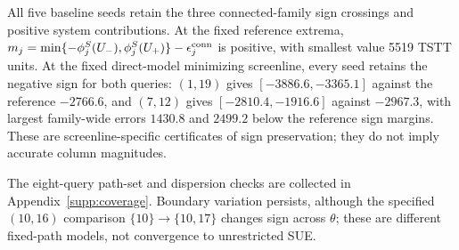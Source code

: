 All five baseline seeds retain the three connected-family sign
crossings and positive system contributions. At the fixed reference
extrema,
$m_j=\min\{-\phi_j^S(U_-),\phi_j^S(U_+)\}-\epsilon_j^{\rm conn}$
is positive, with smallest value 5519 TSTT units. At the fixed
direct-model minimizing screenline, every seed retains the negative
sign for both queries: $(1,19)$ gives $[-3886.6,-3365.1]$ against the
reference $-2766.6$, and $(7,12)$ gives $[-2810.4,-1916.6]$ against
$-2967.3$, with largest family-wide errors $1430.8$ and $2499.2$ below
the reference sign margins. These are screenline-specific certificates
of sign preservation; they do not imply accurate column magnitudes.


The eight-query path-set and dispersion checks are collected in
Appendix~\ref{supp:coverage}. Boundary variation persists, although
the specified $(10,16)$ comparison $\{10\}\to\{10,17\}$ changes sign
across $\theta$; these are different fixed-path models, not convergence
to unrestricted SUE.

